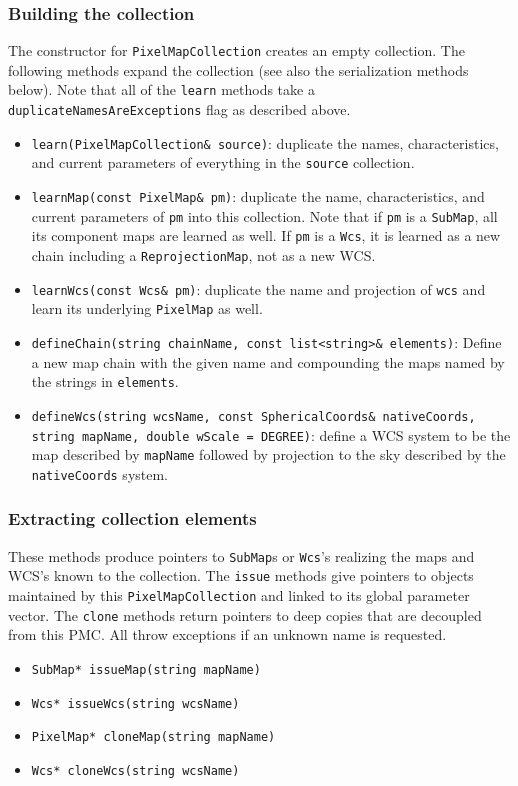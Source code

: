 \documentclass[11pt,preprint,flushrt]{aastex}
\begin{document}
\subsubsection{Building the collection}
The constructor for {\tt PixelMapCollection} creates an empty collection.  The following methods expand the collection (see also the serialization methods below).  Note that all of the {\tt learn} methods take a {\tt duplicateNamesAreExceptions} flag as described above.
\begin{itemize}
\item {\tt learn(PixelMapCollection\& source)}: duplicate the names, characteristics, and current parameters of everything in the {\tt source} collection.
\item {\tt learnMap(const PixelMap\& pm)}: duplicate the name, characteristics, and current parameters of {\tt pm} into this collection.  Note that if {\tt pm} is a {\tt SubMap}, all its component maps are learned as well.  If {\tt pm} is a {\tt Wcs}, it is learned as a new chain including a {\tt ReprojectionMap}, not as a new WCS.
\item {\tt learnWcs(const Wcs\& pm)}: duplicate the name and projection of {\tt wcs} and learn its underlying {\tt PixelMap} as well. 
\item {\tt defineChain(string chainName, const list<string>\& elements)}: Define a new map chain with the given name and compounding the maps named by the strings in {\tt elements}.
\item {\tt defineWcs(string wcsName, const SphericalCoords\& nativeCoords, string mapName,
		   double wScale = DEGREE)}: define a WCS system to be the map described by {\tt mapName} followed by projection to the sky described by the {\tt nativeCoords} system. 
               \end{itemize}

\subsubsection{Extracting collection elements}
These methods produce pointers to {\tt SubMap}s or {\tt Wcs}'s realizing the maps and WCS's known to the collection.  The {\tt issue} methods give pointers to objects maintained by this {\tt PixelMapCollection} and linked to its global parameter vector.  The {\tt clone} methods return pointers to deep copies that are decoupled from this PMC.  All throw exceptions if an unknown name is requested.
\begin{itemize}
\item {\tt SubMap* issueMap(string mapName)}
\item {\tt Wcs* issueWcs(string wcsName)}
\item {\tt PixelMap* cloneMap(string mapName)}
\item {\tt Wcs* cloneWcs(string wcsName)}
\end{itemize}
\end{document}
